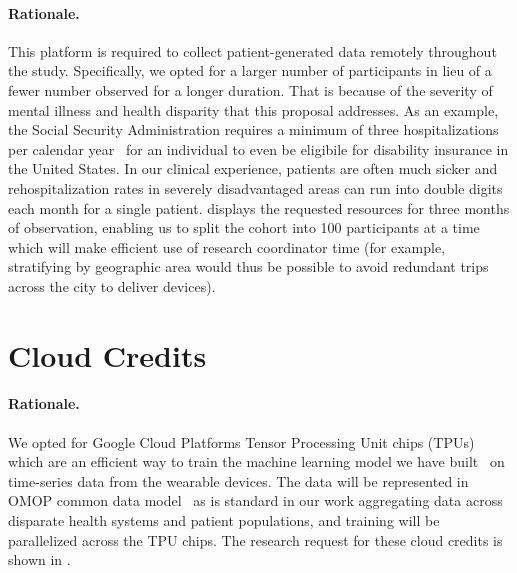 \documentclass[twoside]{article}
\begin{document}
\paragraph{Rationale.} This platform is required to collect patient-generated data remotely throughout the study. Specifically, we opted for a larger number of participants in lieu of a fewer number observed for a longer duration. That is because of the severity of mental illness and health disparity that this proposal addresses. As an example, the Social Security Administration requires a minimum of three hospitalizations per calendar year~\cite{ssa_appendix_2022} for an individual to even be eligibile for disability insurance in the United States. In our clinical experience, patients are often much sicker and rehospitalization rates in severely disadvantaged areas can run into double digits each month for a single patient.  displays the requested resources for three months of observation, enabling us to split the cohort into 100 participants at a time which will make efficient use of research coordinator time (for example, stratifying by geographic area would thus be possible to avoid redundant trips across the city to deliver devices).

\section{Cloud Credits}
\paragraph{Rationale.} We opted for Google Cloud Platforms Tensor Processing Unit chips (TPUs) which are an efficient way to train the machine learning model we have built~\cite{huang_clinicalbert_2020} on time-series data from the wearable devices. The data will be represented in OMOP common data model~\cite{voss_feasibility_2015} as is standard in our work aggregating data across disparate health systems and patient populations, and training will be parallelized across the TPU chips. The research request for these cloud credits is shown in .
\end{document}
